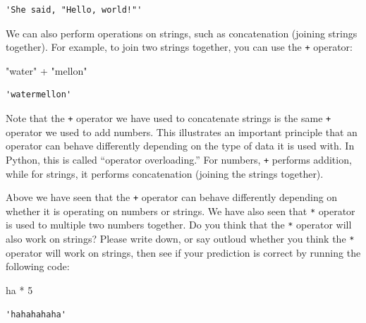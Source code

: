 \documentclass[
  letterpaper,
  DIV=11,
  numbers=noendperiod]{scrreprt}
\newenvironment{Shaded}{\begin{snugshade}}{\end{snugshade}}
\newcommand{\CommentTok}[1]{\textcolor[rgb]{0.37,0.37,0.37}{#1}}
\newcommand{\DecValTok}[1]{\textcolor[rgb]{0.68,0.00,0.00}{#1}}
\newcommand{\OperatorTok}[1]{\textcolor[rgb]{0.37,0.37,0.37}{#1}}
\newcommand{\StringTok}[1]{\textcolor[rgb]{0.13,0.47,0.30}{#1}}
\begin{document}
\begin{verbatim}
'She said, "Hello, world!"'
\end{verbatim}

We can also perform operations on strings, such as concatenation
(joining strings together). For example, to join two strings together,
you can use the \texttt{+} operator:

\begin{Shaded}
\begin{Highlighting}[]
\CommentTok{"water"} \OperatorTok{+} \StringTok{"mellon"}
\end{Highlighting}
\end{Shaded}

\begin{verbatim}
'watermellon'
\end{verbatim}

Note that the \texttt{+} operator we have used to concatenate strings is
the same \texttt{+} operator we used to add numbers. This illustrates an
important principle that an operator can behave differently depending on
the type of data it is used with. In Python, this is called ``operator
overloading.'' For numbers, \texttt{+} performs addition, while for
strings, it performs concatenation (joining the strings together).

\begin{tcolorbox}[enhanced jigsaw, bottomtitle=1mm, colframe=quarto-callout-tip-color-frame, toptitle=1mm, colbacktitle=quarto-callout-tip-color!10!white, rightrule=.15mm, leftrule=.75mm, opacityback=0, breakable, coltitle=black, left=2mm, opacitybacktitle=0.6, titlerule=0mm, bottomrule=.15mm, title=\textcolor{quarto-callout-tip-color}{\faLightbulb}\hspace{0.5em}{Exercise}, arc=.35mm, colback=white, toprule=.15mm]

Above we have seen that the \texttt{+} operator can behave differently
depending on whether it is operating on numbers or strings. We have also
seen that \texttt{*} operator is used to multiple two numbers together.
Do you think that the \texttt{*} operator will also work on strings?
Please write down, or say outloud whether you think the \texttt{*}
operator will work on strings, then see if your prediction is correct by
running the following code:

\begin{Shaded}
\begin{Highlighting}[]
\CommentTok{\textquotesingle{}ha\textquotesingle{}} \OperatorTok{*} \DecValTok{5}
\end{Highlighting}
\end{Shaded}

\begin{verbatim}
'hahahahaha'
\end{verbatim}

\end{tcolorbox}
\end{document}
